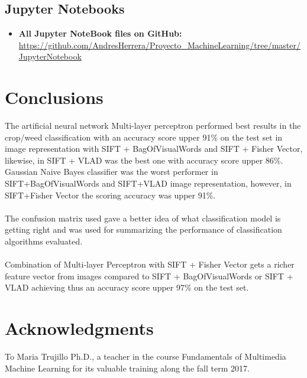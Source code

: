 \documentclass[12pt]{article}
\numberwithin{equation}{section}
\numberwithin{table}{section}
\numberwithin{figure}{section}
\begin{document}
\subsection{Jupyter Notebooks}
\begin{itemize}
	\item {\textbf{All Jupyter NoteBook files on GitHub:} } \url{https://github.com/AndresHerrera/Proyecto_MachineLearning/tree/master/JupyterNotebook} 
\end{itemize}

	
	
\section{Conclusions}

The artificial neural network Multi-layer perceptron performed best results in the crop/weed classification with an accuracy score upper 91\% on the test set in image representation with SIFT + BagOfVisualWords and SIFT + Fisher Vector, likewise, in SIFT + VLAD  was the best one with accuracy score upper 86\%. Gaussian Naive Bayes classifier was the worst performer in SIFT+BagOfVisualWords and SIFT+VLAD image representation, however, in SIFT+Fisher Vector the scoring accuracy was upper 91\%.\\\\
\noindent
The confusion matrix used gave a better idea of what classification model is getting right and was used for summarizing the performance of classification algorithms evaluated. \\\\
\noindent
Combination of Multi-layer Perceptron with SIFT + Fisher Vector gets a richer feature vector from images compared to SIFT + BagOfVisualWords  or  SIFT + VLAD achieving thus an accuracy score upper 97\% on the test set.



\section*{Acknowledgments}

To Maria Trujillo Ph.D., a teacher in the course Fundamentals of Multimedia Machine Learning for its valuable training along the fall term 2017.
 



\end{document}
